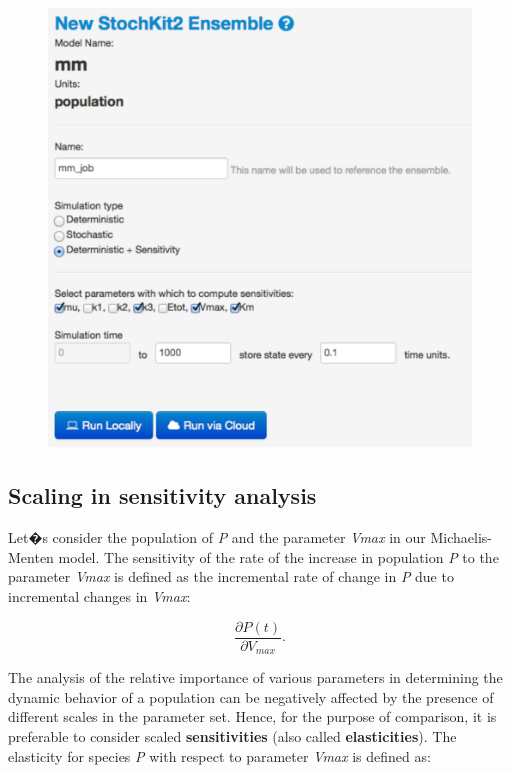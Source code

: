 \begin{figure}[!htb]
\centering
\includegraphics[scale=0.64]{T2/sensi.pdf}
\end{figure}

\subsection{Scaling in sensitivity analysis}
Let�s consider the population of \textit{P} and the parameter \textit{Vmax} in our Michaelis-Menten model. The sensitivity of the rate of the increase in population \textit{P} to the parameter \textit{Vmax} is defined as the incremental rate of change in \textit{P} due to incremental changes in \textit{Vmax}:

\begin{equation}
\frac{\partial P(t)}{\partial V_{max}}.
\end{equation}

The analysis of the relative importance of various parameters in determining the dynamic behavior of a population can be negatively affected by the presence of different scales in the parameter set. Hence, for the purpose of comparison, it is preferable to consider scaled \textbf{sensitivities} (also called \textbf{elasticities}). The elasticity for species \textit{P} with respect to parameter \textit{Vmax} is defined as:

